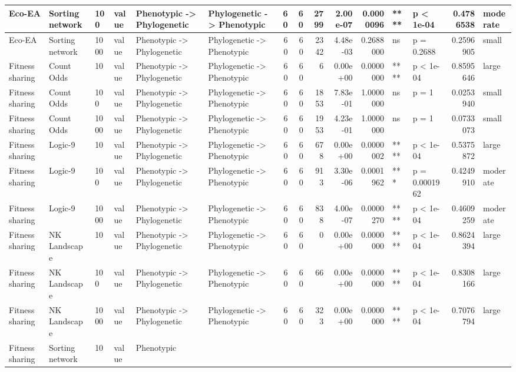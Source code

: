 \documentclass[]{book}
\begin{document}
\begin{table}
\begin{tabular}[t]{l|l|l|l|l|l|r|r|r|r|r|l|l|r|l}
\hline
Eco-EA & Sorting network & 100 & value & Phenotypic
    ->
Phylogenetic & Phylogenetic
    ->
Phenotypic & 60 & 60 & 2799 & 2.00e-07 & 0.0000096 & **** & p < 1e-04 & 0.4786538 & moderate\\
\hline
Eco-EA & Sorting network & 1000 & value & Phenotypic
    ->
Phylogenetic & Phylogenetic
    ->
Phenotypic & 60 & 60 & 2342 & 4.48e-03 & 0.2688000 & ns & p = 0.2688 & 0.2596905 & small\\
\hline
Fitness sharing & Count Odds & 10 & value & Phenotypic
    ->
Phylogenetic & Phylogenetic
    ->
Phenotypic & 60 & 60 & 6 & 0.00e+00 & 0.0000000 & **** & p < 1e-04 & 0.8595646 & large\\
\hline
Fitness sharing & Count Odds & 100 & value & Phenotypic
    ->
Phylogenetic & Phylogenetic
    ->
Phenotypic & 60 & 60 & 1853 & 7.83e-01 & 1.0000000 & ns & p = 1 & 0.0253940 & small\\
\hline
Fitness sharing & Count Odds & 1000 & value & Phenotypic
    ->
Phylogenetic & Phylogenetic
    ->
Phenotypic & 60 & 60 & 1953 & 4.23e-01 & 1.0000000 & ns & p = 1 & 0.0733073 & small\\
\hline
Fitness sharing & Logic-9 & 10 & value & Phenotypic
    ->
Phylogenetic & Phylogenetic
    ->
Phenotypic & 60 & 60 & 678 & 0.00e+00 & 0.0000002 & **** & p < 1e-04 & 0.5375872 & large\\
\hline
Fitness sharing & Logic-9 & 100 & value & Phenotypic
    ->
Phylogenetic & Phylogenetic
    ->
Phenotypic & 60 & 60 & 913 & 3.30e-06 & 0.0001962 & *** & p = 0.0001962 & 0.4249910 & moderate\\
\hline
Fitness sharing & Logic-9 & 1000 & value & Phenotypic
    ->
Phylogenetic & Phylogenetic
    ->
Phenotypic & 60 & 60 & 838 & 4.00e-07 & 0.0000270 & **** & p < 1e-04 & 0.4609259 & moderate\\
\hline
Fitness sharing & NK Landscape & 10 & value & Phenotypic
    ->
Phylogenetic & Phylogenetic
    ->
Phenotypic & 60 & 60 & 0 & 0.00e+00 & 0.0000000 & **** & p < 1e-04 & 0.8624394 & large\\
\hline
Fitness sharing & NK Landscape & 100 & value & Phenotypic
    ->
Phylogenetic & Phylogenetic
    ->
Phenotypic & 60 & 60 & 66 & 0.00e+00 & 0.0000000 & **** & p < 1e-04 & 0.8308166 & large\\
\hline
Fitness sharing & NK Landscape & 1000 & value & Phenotypic
    ->
Phylogenetic & Phylogenetic
    ->
Phenotypic & 60 & 60 & 323 & 0.00e+00 & 0.0000000 & **** & p < 1e-04 & 0.7076794 & large\\
\hline
Fitness sharing & Sorting network & 10 & value & Phenotypic

\end{tabular}
\end{table}
\end{document}

